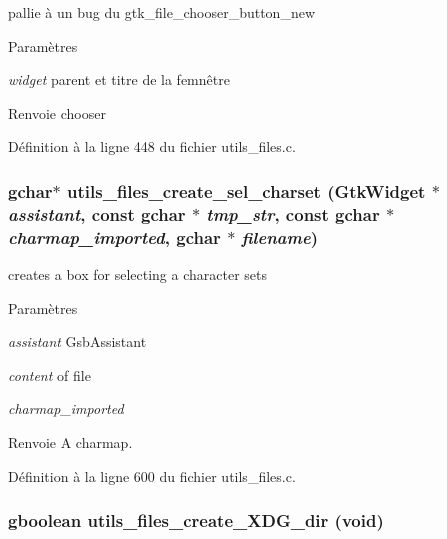 pallie à un bug du gtk\_\-file\_\-chooser\_\-button\_\-new 


\begin{DoxyParams}{Paramètres}
\item[{\em widget}]parent et titre de la femnêtre\end{DoxyParams}
\begin{DoxyReturn}{Renvoie}
chooser 
\end{DoxyReturn}


Définition à la ligne 448 du fichier utils\_\-files.c.

\subsubsection[{utils\_\-files\_\-create\_\-sel\_\-charset}]{\setlength{\rightskip}{0pt plus 5cm}gchar$\ast$ utils\_\-files\_\-create\_\-sel\_\-charset (GtkWidget $\ast$ {\em assistant}, \/  const gchar $\ast$ {\em tmp\_\-str}, \/  const gchar $\ast$ {\em charmap\_\-imported}, \/  gchar $\ast$ {\em filename})}\label{utils__files_8c_a317adcd21f47902ddbd7b39ea98a8ec6}
creates a box for selecting a character sets


\begin{DoxyParams}{Paramètres}
\item[{\em assistant}]GsbAssistant \item[{\em content}]of file \item[{\em charmap\_\-imported}]\end{DoxyParams}
\begin{DoxyReturn}{Renvoie}
A charmap. 
\end{DoxyReturn}


Définition à la ligne 600 du fichier utils\_\-files.c.

\subsubsection[{utils\_\-files\_\-create\_\-XDG\_\-dir}]{\setlength{\rightskip}{0pt plus 5cm}gboolean utils\_\-files\_\-create\_\-XDG\_\-dir (void)}\label{utils__files_8c_a2bf4ade67ac3b60272da8b85baaff59b}


